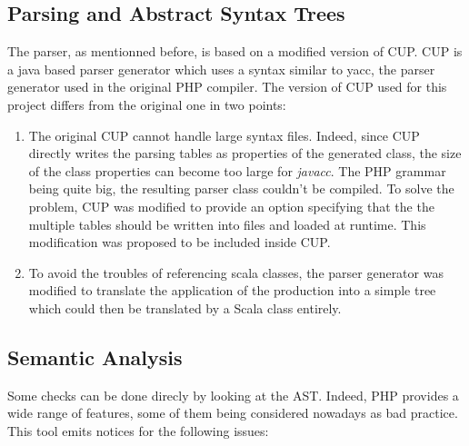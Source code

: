 \documentclass[a4paper]{article}
\begin{document}
\subsection{Parsing and Abstract Syntax Trees}
The parser, as mentionned before, is based on a modified version of CUP. CUP is
a java based parser generator which uses a syntax similar to yacc, the parser
generator used in the original PHP compiler. The version of CUP used for this
project differs from the original one in two points:
\begin{enumerate}
  \item The original CUP cannot handle large syntax files. Indeed, since CUP
    directly writes the parsing tables as properties of the generated class,
    the size of the class properties can become too large for \emph{javacc}. The
    PHP grammar being quite big, the resulting parser class couldn't be compiled.
    To solve the problem, CUP was modified to provide an option specifying that the
    the multiple tables should be written into files and loaded at runtime. This
    modification was proposed to be included inside CUP.
  \item To avoid the troubles of referencing scala classes, the parser
    generator was modified to translate the application of the production into a
    simple tree which could then be translated by a Scala class entirely.
\end{enumerate}

\subsection{Semantic Analysis}
Some checks can be done direcly by looking at the AST. Indeed, PHP provides a
wide range of features, some of them being considered nowadays as bad practice.
This tool emits notices for the following issues:
\end{document}
